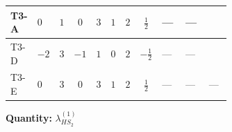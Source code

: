 \documentclass[8pt]{article}
\begin{document}
\begin{landscape}
\begin{longtable}{@{}llcccccc >{\raggedright\arraybackslash}p{0.21\linewidth} >{\raggedright\arraybackslash}p{0.21\linewidth} >{\raggedright\arraybackslash}p{0.21\linewidth}@{}}
\midrule
T3-A & $0$ & $1$ & $0$ & $3$ & $1$ & $2$ & $\frac{1}{2}$ & --- & --- & \scriptsize\adjustbox{max width=\linewidth}{$\begin{gathered} +2 {\lambda_{12}^{(1)}} {\lambda_{HS_1}^{(1)}}\end{gathered}$} \\
\midrule
T3-D & $-2$ & $3$ & $-1$ & $1$ & $0$ & $2$ & $-\frac{1}{2}$ & --- & --- & \scriptsize\adjustbox{max width=\linewidth}{$\begin{gathered} +6 {\lambda_{12}^{(1)}} {\lambda_{HS_1}^{(1)}}\end{gathered}$} \\
\midrule
T3-E & $0$ & $3$ & $0$ & $3$ & $1$ & $2$ & $\frac{1}{2}$ & --- & --- & --- \\
\midrule
\bottomrule
\end{longtable}
\clearpage
\noindent\textbf{Quantity: }$\lambda_{HS_2}^{(1)}$\par\smallskip

\end{landscape}
\end{document}
